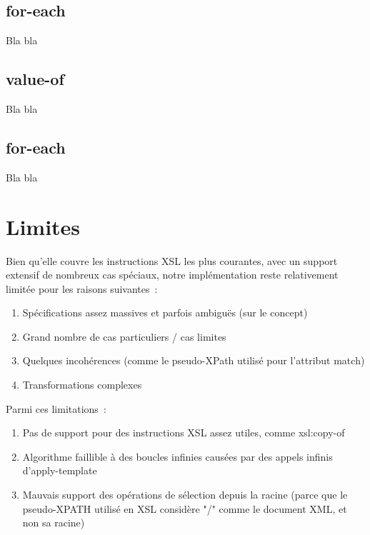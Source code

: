     \subsection{for-each}
        Bla bla

    \subsection{value-of}
        Bla bla

    \subsection{for-each}
        Bla bla

\section{Limites}

Bien qu'elle couvre les instructions XSL les plus courantes, avec un support extensif de nombreux cas spéciaux,
notre implémentation reste relativement limitée pour les raisons suivantes~:

\begin{enumerate}
    \item Spécifications assez massives et parfois ambiguës (sur le concept)
    \item Grand nombre de cas particuliers / cas limites
    \item Quelques incohérences (comme le pseudo-XPath utilisé pour l'attribut match)
    \item Transformations complexes
\end{enumerate}

Parmi ces limitations~:

\begin{enumerate}
    \item Pas de support pour des instructions XSL assez utiles, comme xsl:copy-of
    \item Algorithme faillible à des boucles infinies causées par des appels infinis d'apply-template
    \item Mauvais support des opérations de sélection depuis la racine (parce que le pseudo-XPATH utilisé en XSL considère "/" comme le document XML, et non sa racine)
\end{enumerate}
